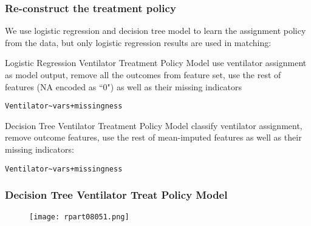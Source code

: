\documentclass{beamer}
\begin{document}
\begin{frame}[fragile]
\frametitle{Re-construct the treatment policy}
We use logistic regression and decision tree model to learn the assignment policy from the data, but only logistic regression results are used in matching:
\begin{block}{Logistic Regression Ventilator Treatment Policy Model}
use ventilator assignment as model output, remove all the outcomes from feature set, use the rest of features (NA encoded as ``0") as well as their missing indicators 
\begin{verbatim}
Ventilator~vars+missingness
\end{verbatim}
\end{block}
\begin{block}{Decision Tree Ventilator Treatment Policy Model}
classify ventilator assignment, remove outcome features, use the rest of mean-imputed features as well as their missing indicators: 
\begin{verbatim}
Ventilator~vars+missingness
\end{verbatim}
\end{block}
\end{frame} 
\begin{frame}
\frametitle{Decision Tree Ventilator Treat Policy Model}
\begin{figure}
\texttt{[image: rpart08051.png]}
\end{figure}
\end{frame}
\end{document}
